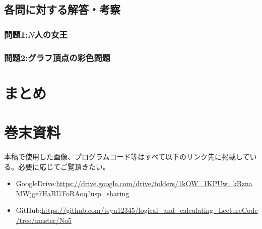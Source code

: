 \documentclass[dvipdfmx]{jsarticle}
\begin{document}
\subsection{各問に対する解答・考察}
\subsubsection{問題1:$N$人の女王}
\subsubsection{問題2:グラフ頂点の彩色問題}
\section{まとめ}
\section{巻末資料}
本稿で使用した画像、プログラムコード等はすべて以下のリンク先に掲載している。必要に応じてご覧頂きたい。
\begin{itemize}
  \item GoogleDrive:\url{https://drive.google.com/drive/folders/1kOW_1KPUw_kBznaMWjge7HaBI7FoRAoq?usp=sharing}
  \item GitHub:\url{https://github.com/tsyu12345/logical_and_calculating_LectureCode/tree/master/No5}
\end{itemize}
\end{document}
